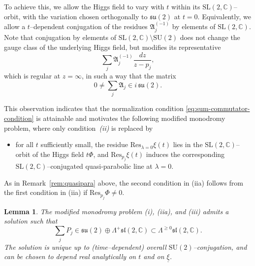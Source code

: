 \documentclass[12pt,a4paper]{amsart}
\newtheorem{lemma}[theorem]{Lemma}
\theoremstyle{definition}
\theoremstyle{remark}
\newcommand{\C}{\mathbb C}
\newcommand{\Res}{\mathrm{Res}}
\begin{document}
To achieve this, we allow the Higgs field to vary with $t$ within its
$\mathrm{SL}(2,\C)$--orbit, with the variation chosen orthogonally to
$\mathfrak{su}(2)$ at $t=0$.
Equivalently, we allow a $t$--dependent conjugation of the residues
$\mathfrak A_j^{(-1)}$ by elements of $\mathrm{SL}(2,\C)$.
Note that conjugation by elements of $\mathrm{SL}(2,\C)\setminus \mathrm{SU}(2)$
does not change the gauge class of the underlying Higgs field, but modifies its representative
\[
\sum_j\mathfrak A_j^{(-1)}\frac{dz}{z-p_j},
\]
which is regular at $z=\infty$, in such a way that the matrix 
\[
0\neq \sum_j {\mathfrak A}_j \in i\,\mathfrak{su}(2).
\]

This observation indicates that the normalization condition
\eqref{eq:sum-commutator-condition} is attainable and motivates the following
modified monodromy problem, where only condition~\emph{(ii)} is replaced by
\begin{itemize}
\item[(iia)]
for all $t$ sufficiently small, the residue $\Res_{\lambda=0}\xi(t)$ lies in the
$\mathrm{SL}(2,\C)$--orbit of the Higgs field $t\Phi$, and 
$\Res_{p_j}\xi(t)$ induces the  corresponding $\mathrm{SL}(2,\C)$--conjugated quasi-parabolic line at $\lambda=0$.
\end{itemize}
As in Remark~\ref{rem:quasipara} above, the second condition in (iia) follows from the first condition
in (iia) if $\Res_{p_j}\Phi\neq0.$


\begin{lemma}\label{lem:modified-monodromy}
The modified monodromy problem \emph{(i)}, \emph{(iia)}, and \emph{(iii)} admits a solution such that
\begin{equation}\label{eq:iftaddon}
\sum_j P_j
\in
\mathfrak{su}(2)\oplus \Lambda^{+}\mathfrak{sl}(2,\C)
\subset
\Lambda^{\geq0}\mathfrak{sl}(2,\C).
\end{equation}
The solution is unique up to (time--dependent) overall $\mathrm{SU}(2)$--conjugation, and can be chosen
to depend real analytically on $t$ and on $\underline\xi$.
\end{lemma}
\end{document}
